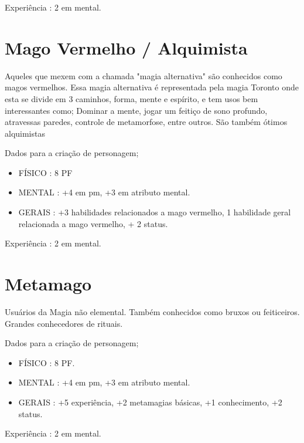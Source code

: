 Experiência : 2 em mental.

\section{Mago Vermelho / Alquimista }

 Aqueles que mexem com a chamada "magia alternativa" são conhecidos como magos vermelhos. Essa magia alternativa é representada pela magia Toronto onde esta se divide em 3 caminhos, forma, mente e espírito, e tem usos bem interessantes como; Dominar a mente, jogar um feitiço de sono profundo, atravessas paredes, controle de metamorfose, entre outros. São também ótimos alquimistas

Dados para a criação de personagem;

\begin{itemize}


	\item FÍSICO : 8 PF  

	\item MENTAL : +4 em pm, +3 em atributo mental.

	\item GERAIS : +3 habilidades relacionados a mago vermelho, 1 habilidade geral relacionada a mago vermelho, + 2 status.

\end{itemize}

Experiência : 2 em mental.

\section{Metamago}

Usuários da Magia não elemental. Também conhecidos como bruxos ou feiticeiros. Grandes conhecedores de rituais.

Dados para a criação de personagem;

\begin{itemize}


	\item FÍSICO : 8 PF.  

	\item MENTAL : +4 em pm, +3 em atributo mental. 

	\item GERAIS : +5 experiência, +2 metamagias básicas, +1 conhecimento, +2 status.

\end{itemize}

Experiência : 2 em mental.

